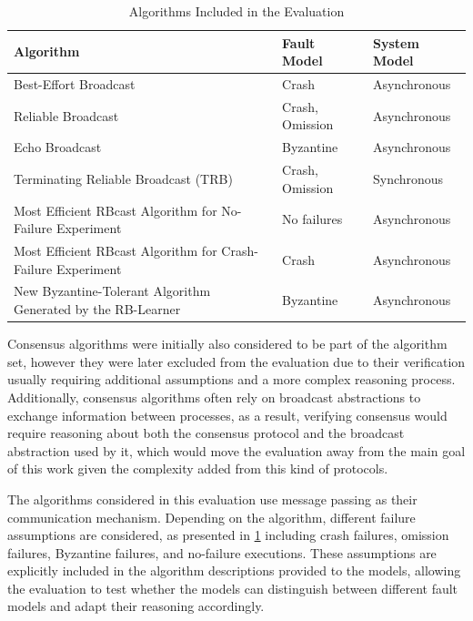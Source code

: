 \begin{table}[H]
\centering
\renewcommand{\arraystretch}{1.35}
\caption{Algorithms Included in the Evaluation}
\label{tab:algo-characteristics}
\begin{tabular}{|>{\raggedright\arraybackslash}p{6cm}|
                >{\raggedright\arraybackslash}p{4cm}|
                >{\raggedright\arraybackslash}p{3.5cm}|}
\hline
\textbf{Algorithm} & \textbf{Fault Model} & \textbf{System Model} \\
\hline
Best-Effort Broadcast & Crash & Asynchronous \\
\hline
Reliable Broadcast & Crash, Omission & Asynchronous \\
\hline
Echo Broadcast & Byzantine & Asynchronous \\
\hline
Terminating Reliable Broadcast (TRB) & Crash, Omission & Synchronous \\
\hline
Most Efficient RBcast Algorithm for No-Failure Experiment & No failures & Asynchronous \\
\hline
Most Efficient RBcast Algorithm for Crash-Failure Experiment & Crash & Asynchronous \\
\hline
New Byzantine-Tolerant Algorithm Generated by the RB-Learner & Byzantine & Asynchronous \\
\hline
\end{tabular}
\end{table}

Consensus algorithms were initially also considered to be part of the algorithm set, however they were later excluded from the evaluation due to their verification usually requiring additional assumptions and a more complex reasoning process. Additionally, consensus algorithms often rely on broadcast abstractions to exchange information between processes, as a result, verifying consensus would require reasoning about both the consensus protocol and the broadcast abstraction used by it, which would move the evaluation away from the main goal of this work given the complexity added from this kind of protocols.

The algorithms considered in this evaluation use message passing as their communication mechanism. Depending on the algorithm, different failure assumptions are considered, as presented in \ref{tab:algo-characteristics} including crash failures, omission failures, Byzantine failures, and no-failure executions. These assumptions are explicitly included in the algorithm descriptions provided to the models, allowing the evaluation to test whether the models can distinguish between different fault models and adapt their reasoning accordingly.

